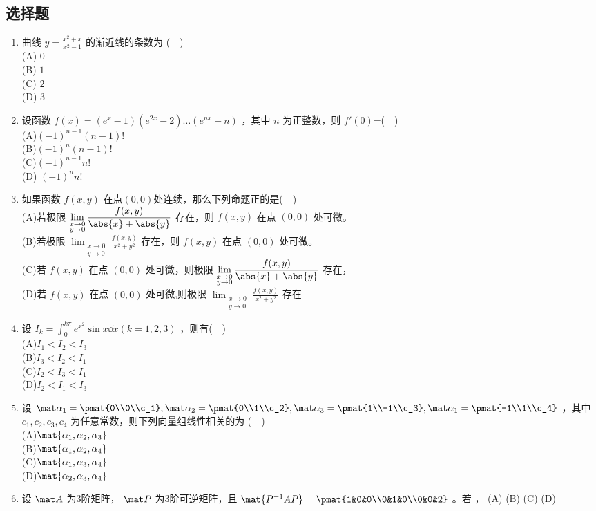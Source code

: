 \subsection{选择题}
\begin{enumerate}
\item 曲线 $\displaystyle y=\frac{x^2+x}{x^2-1}$ 的渐近线的条数为 ($\quad$)\\
(A) $0$\\
(B) $1$\\
(C) $2$\\
(D) $3$
\item 设函数 $f(x)=(e^x-1)(e^{2x}-2)\dots(e^{nx}-n)$ ，其中 $n$ 为正整数，则 $f'(0)$=($\quad$)\\
(A)$(-1)^{n-1}(n-1)!$\\
(B)$(-1)^n(n-1)!$\\
(C)$(-1)^{n-1}n!$\\
(D) $(-1)^n n!$
\item 如果函数 $f(x,y)$ 在点$ (0,0) $处连续，那么下列命题正的是($\quad$)\\
(A)若极限 $\displaystyle \lim_{\substack {x\to0 \\ y\to 0}}\frac{f(x,y)}{\abs{x}+\abs{y}}$ 存在，则 $f(x,y)$ 在点  $(0,0)$ 处可微。\\
(B)若极限 $\displaystyle \lim_{\substack {x\to0 \\ y\to 0}}\frac{f(x,y)}{x^2+y^2}$ 存在，则 $f(x,y)$ 在点  $(0,0)$ 处可微。\\
(C)若 $f(x,y)$ 在点  $(0,0)$ 处可微，则极限 $\displaystyle \lim_{\substack {x\to0 \\ y\to 0}}\frac{f(x,y)}{\abs{x}+\abs{y}}$ 存在，\\
(D)若 $f(x,y)$ 在点  $(0,0)$ 处可微,则极限 $\displaystyle \lim_{\substack {x\to0 \\ y\to 0}}\frac{f(x,y)}{x^2+y^2}$ 存在
\item 设 $\displaystyle I_k=\int_{0}^{k\pi} e^{x^2}\sin x\dd{x}(k=1,2,3) $ ，则有($\quad$)\\
(A)$I_1<I_2<I_3$\\
(B)$I_3<I_2<I_1$\\
(C)$I_2<I_3<I_1$\\
(D)$I_2<I_1<I_3$
\item  设 $\mat \alpha_1=\pmat{0\\0\\c_1},\mat \alpha_2=\pmat{0\\1\\c_2},\mat \alpha_3=\pmat{1\\-1\\c_3},\mat \alpha_1=\pmat{-1\\1\\c_4}$ ，其中 $c_1,c_2,c_3,c_4$ 为任意常数，则下列向量组线性相关的为 ($\quad$)\\
(A)$\mat{ \alpha_1,\alpha_2,\alpha_3}$\\
(B)$\mat{ \alpha_1,\alpha_2,\alpha_4}$\\
(C)$\mat{ \alpha_1,\alpha_3,\alpha_4}$\\
(D)$\mat{ \alpha_2,\alpha_3,\alpha_4}$
\item 设 $\mat A$  为3阶矩阵， $\mat P$ 为3阶可逆矩阵，且 $\mat{P^{-1}AP}=\pmat{1&0&0\\0&1&0\\0&0&2}$  。若  ，
(A)
(B)
(C)
(D)
\end{enumerate}

